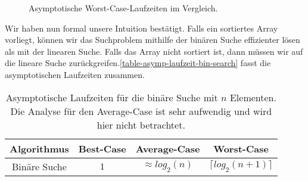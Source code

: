 \begin{figure}[htb]
	\centering
{}
\caption{Asymptotische Worst-Case-Laufzeiten im Vergleich.}
\label{figure-asymp-laufzeiten-wc-compare}
\end{figure}


Wir haben nun formal unsere Intuition bestätigt. Falls ein sortiertes Array vorliegt, können wir das Suchproblem mithilfe der binären Suche effizienter lösen als mit der linearen Suche. Falls das Array nicht sortiert ist, dann müssen wir auf die lineare Suche zurückgreifen.\autoref{table-asymp-laufzeit-bin-search} fasst die asymptotischen Laufzeiten zusammen.

\begin{table}[htb]
\centering
\begin{tabular}{|c|c|c|c|}
\hline
Algorithmus & Best-Case & Average-Case & Worst-Case \\ \hline
Binäre Suche & $1$ & $\approx log_2{(n)}$ & $\lceil log_2{(n+1)} \rceil$ \\ \hline
\end{tabular}
\caption{Asymptotische Laufzeiten für die binäre Suche mit $n$ Elementen. Die Analyse für den Average-Case ist sehr aufwendig und wird hier nicht betrachtet.}
\label{table-asymp-laufzeit-bin-search}
\end{table}
